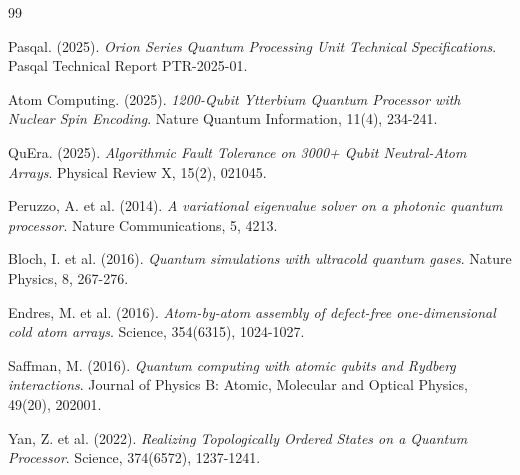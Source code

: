 \documentclass[12pt]{article}
\begin{document}

\begin{thebibliography}{99}

Pasqal. (2025). \emph{Orion Series Quantum Processing Unit Technical Specifications}. Pasqal Technical Report PTR-2025-01.

Atom Computing. (2025). \emph{1200-Qubit Ytterbium Quantum Processor with Nuclear Spin Encoding}. Nature Quantum Information, 11(4), 234-241.

QuEra. (2025). \emph{Algorithmic Fault Tolerance on 3000+ Qubit Neutral-Atom Arrays}. Physical Review X, 15(2), 021045.

Peruzzo, A. et al. (2014). \emph{A variational eigenvalue solver on a photonic quantum processor}. Nature Communications, 5, 4213.

Bloch, I. et al. (2016). \emph{Quantum simulations with ultracold quantum gases}. Nature Physics, 8, 267-276.

Endres, M. et al. (2016). \emph{Atom-by-atom assembly of defect-free one-dimensional cold atom arrays}. Science, 354(6315), 1024-1027.

Saffman, M. (2016). \emph{Quantum computing with atomic qubits and Rydberg interactions}. Journal of Physics B: Atomic, Molecular and Optical Physics, 49(20), 202001.

Yan, Z. et al. (2022). \emph{Realizing Topologically Ordered States on a Quantum Processor}. Science, 374(6572), 1237-1241.

\end{thebibliography}
\end{document}
